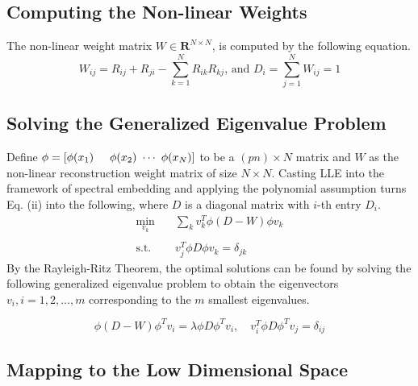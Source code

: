 \documentclass[a0,landscape]{a0poster}
\begin{document}
\begin{multicols}{4}
\subsection*{Computing the Non-linear Weights}
The non-linear weight matrix $W\in\mathbf{R}^{N\times N}$, is computed by the following equation. 
\begin{equation}
W_{ij} = R_{ij} + R_{ji} - \sum_{k=1}^{N}{R_{ik}R_{kj} \text{, and } D_i = \sum_{j=1}^N{W_{ij}}=1}
\end{equation}

\subsection*{Solving the Generalized Eigenvalue Problem}
Define $\phi = \left[\phi(x_1) \hspace{0.5cm} \phi(x_2) \text{ }\cdots\text{ } \phi(x_N)\right]$ to be a $(pn) \times N$ matrix and $W$ as the non-linear reconstruction weight matrix of size $N \times N$. Casting LLE into the framework of spectral embedding and applying the polynomial assumption turns Eq. (ii) into the following, where $D$ is a diagonal matrix with $i$-th entry $D_i$.
\begin{align*}
    \min_{v_k} \quad &\sum_{k}{v_k^T\phi (D-W)\phi v_k} \\
    \\
    \text{s.t.} \quad &v_j^T\phi D \phi v_k=\delta_{jk}
\end{align*}
By the Rayleigh-Ritz Theorem, the optimal solutions can be found by solving the following generalized eigenvalue problem to obtain the eigenvectors $v_i, i=1,2,...,m$ corresponding to the $m$ smallest eigenvalues. 

\begin{equation}
\phi(D-W)\phi^Tv_i = \lambda \phi D\phi^Tv_i, \quad v_i^T\phi D\phi^Tv_j=\delta_{ij}
\end{equation}

\subsection*{Mapping to the Low Dimensional Space}


\end{multicols}
\end{document}
